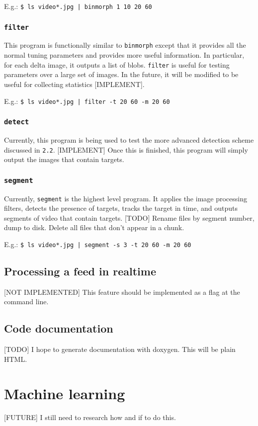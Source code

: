 \documentclass[letter]{article}
\begin{document}
E.g.: \texttt{\$ ls video*.jpg | binmorph 1 10 20 60}

\subsubsection{\texttt{filter}}
This program is functionally similar to \texttt{binmorph} except that it provides all 
the normal tuning parameters and provides more useful information. In particular, for 
each delta image, it outputs a list of blobs. \texttt{filter} is useful for testing 
parameters over a large set of images. In the future, it will be modified to be useful
for collecting statistics [IMPLEMENT].  

E.g.: \texttt{\$ ls video*.jpg | filter -t 20 60 -m 20 60}

\subsubsection{\texttt{detect}}
Currently, this program is being used to test the more advanced detection scheme 
discussed in \texttt{2.2}. [IMPLEMENT] Once this is finished, this program will 
simply output the images that contain targets. 

\subsubsection{\texttt{segment}}
Currently, \texttt{segment} is the highest level program. It applies the image 
processing filters, detects the presence of targets, tracks the target in time, 
and outputs segments of video that contain targets. [TODO] Rename files by 
segment number, dump to disk. Delete all files that don't appear in a chunk. 

E.g.: \texttt{\$ ls video*.jpg | segment -s 3 -t 20 60 -m 20 60}


\subsection{Processing a feed in realtime}
[NOT IMPLEMENTED] This feature should be implemented as a flag at the command line. 

\subsection{Code documentation}
[TODO] I hope to generate documentation with doxygen. This will be plain HTML. 

\section{Machine learning}
[FUTURE] I still need to research how and if to do this. 
\end{document}
